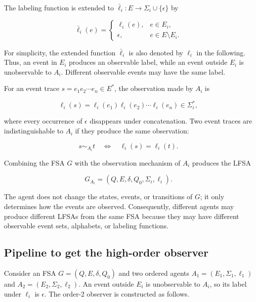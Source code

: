 \documentclass[11pt]{article}
\begin{document}
The labeling function is extended to $\bar{\ell}_i:E\rightarrow\Sigma_i\cup\{\epsilon\}$ by

\[
\bar{\ell}_i(e)=
\begin{cases}
\ell_i(e), & e\in E_i,\\
\epsilon, & e\in E\setminus E_i.
\end{cases}
\]

For simplicity, the extended function $\bar{\ell}_i$ is also denoted by $\ell_i$ in the following. Thus, an event in $E_i$ produces an observable label, while an event outside $E_i$ is unobservable to $A_i$. Different observable events may have the same label.

For an event trace $s=e_1e_2\cdots e_n\in E^*$, the observation made by $A_i$ is

\[
\ell_i(s)=\ell_i(e_1)\ell_i(e_2)\cdots\ell_i(e_n)\in\Sigma_i^*,
\]

where every occurrence of $\epsilon$ disappears under concatenation. Two event traces are indistinguishable to $A_i$ if they produce the same observation:

\[
s\sim_{A_i}t
\quad\Longleftrightarrow\quad
\ell_i(s)=\ell_i(t).
\]

Combining the FSA $G$ with the observation mechanism of $A_i$ produces the LFSA

\[
G_{A_i}=(Q,E,\delta,Q_0,\Sigma_i,\ell_i).
\]

The agent does not change the states, events, or transitions of $G$; it only determines how the events are observed. Consequently, different agents may produce different LFSAs from the same FSA because they may have different observable event sets, alphabets, or labeling functions.


\subsection{Pipeline to get the high-order observer}


Consider an FSA $G=(Q,E,\delta,Q_0)$ and two ordered agents
$A_1=(E_1,\Sigma_1,\ell_1)$ and
$A_2=(E_2,\Sigma_2,\ell_2)$. An event outside $E_i$ is
unobservable to $A_i$, so its label under $\ell_i$ is
$\epsilon$. The order-2 observer is constructed as follows.
\end{document}
